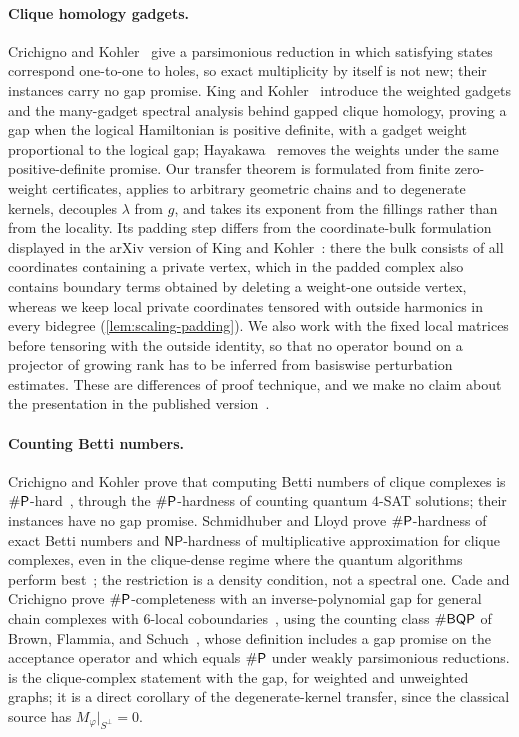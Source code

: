 \paragraph{Clique homology gadgets.}
Crichigno and Kohler~\cite{crichigno2024clique} give a parsimonious reduction
in which satisfying states correspond one-to-one to holes, so exact
multiplicity by itself is not new; their instances carry no gap promise.
King and Kohler~\cite{king2026gapped} introduce the weighted gadgets and the
many-gadget spectral analysis behind gapped clique homology, proving a gap
when the logical Hamiltonian is positive definite, with a gadget weight
proportional to the logical gap; Hayakawa~\cite{hayakawa2026unweighted}
removes the weights under the same positive-definite promise.  Our transfer
theorem is formulated from finite zero-weight certificates, applies to
arbitrary geometric chains and to degenerate kernels, decouples
\(\lambda\) from \(g\), and takes its exponent from the fillings rather than
from the locality.  Its padding step differs from the coordinate-bulk
formulation displayed in the arXiv version of King and
Kohler~\cite[Claim~10.2]{king2023gappedv2}: there the bulk consists of all
coordinates containing a private vertex, which in the padded complex also
contains boundary terms obtained by deleting a weight-one outside vertex,
whereas we keep local private coordinates tensored with outside harmonics
in every bidegree (\cref{lem:scaling-padding}).  We also work with the fixed
local matrices before tensoring with the outside identity, so that no
operator bound on a projector of growing rank has to be inferred from
basiswise perturbation estimates.  These are differences of proof technique,
and we make no claim about the presentation in the published
version~\cite{king2026gapped}.

\paragraph{Counting Betti numbers.}
Crichigno and Kohler prove that computing Betti numbers of clique complexes
is \(\#\mathsf{P}\)-hard~\cite[Theorem~4]{crichigno2024clique}, through the
\(\#\mathsf{P}\)-hardness of counting quantum \(4\)-SAT solutions; their instances
have no gap promise.  Schmidhuber and Lloyd prove \(\#\mathsf{P}\)-hardness of
exact Betti numbers and \(\mathsf{NP}\)-hardness of multiplicative
approximation for clique complexes, even in the clique-dense regime where
the quantum algorithms perform best~\cite{schmidhuber2023limitations}; the
restriction is a density condition, not a spectral one.  Cade and Crichigno
prove \(\#\mathsf{P}\)-completeness with an inverse-polynomial gap for general chain
complexes with \(6\)-local coboundaries~\cite[Theorem~5]{cade2024complexity},
using the counting class \(\#\mathsf{BQP}\) of Brown, Flammia, and
Schuch~\cite{brown2011computational}, whose definition includes a gap promise
on the acceptance operator and which equals \(\#\mathsf{P}\) under weakly
parsimonious reductions.   is the clique-complex
statement with the gap, for weighted and unweighted graphs; it is a direct
corollary of the degenerate-kernel transfer, since the classical source has
\(M_\varphi|_{S^\perp}=0\).


